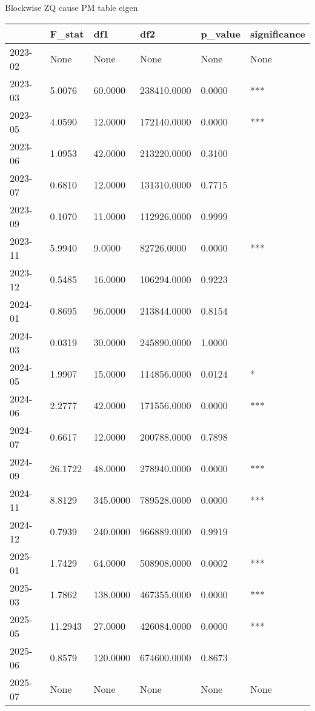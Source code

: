 Blockwise ZQ cause PM table eigen

\begin{center}
  \begin{tabular}{l|l|l|l|l|l}
    \hline
  & F\_stat & df1 & df2 & p\_value & significance\\
  \hline
    2023-02 & None & None & None & None & None\\
    \hline
    2023-03 & 5.0076 & 60.0000 & 238410.0000 & 0.0000 & ***\\
    \hline
    2023-05 & 4.0590 & 12.0000 & 172140.0000 & 0.0000 & ***\\
    \hline
    2023-06 & 1.0953 & 42.0000 & 213220.0000 & 0.3100 & \\
    \hline
    2023-07 & 0.6810 & 12.0000 & 131310.0000 & 0.7715 & \\
    \hline
    2023-09 & 0.1070 & 11.0000 & 112926.0000 & 0.9999 & \\
    \hline
    2023-11 & 5.9940 & 9.0000 & 82726.0000 & 0.0000 & ***\\
    \hline
    2023-12 & 0.5485 & 16.0000 & 106294.0000 & 0.9223 & \\
    \hline
    2024-01 & 0.8695 & 96.0000 & 213844.0000 & 0.8154 & \\
    \hline
    2024-03 & 0.0319 & 30.0000 & 245890.0000 & 1.0000 & \\
    \hline
    2024-05 & 1.9907 & 15.0000 & 114856.0000 & 0.0124 & *\\
    \hline
    2024-06 & 2.2777 & 42.0000 & 171556.0000 & 0.0000 & ***\\
    \hline
    2024-07 & 0.6617 & 12.0000 & 200788.0000 & 0.7898 & \\
    \hline
    2024-09 & 26.1722 & 48.0000 & 278940.0000 & 0.0000 & ***\\
    \hline
    2024-11 & 8.8129 & 345.0000 & 789528.0000 & 0.0000 & ***\\
    \hline
    2024-12 & 0.7939 & 240.0000 & 966889.0000 & 0.9919 & \\
    \hline
    2025-01 & 1.7429 & 64.0000 & 508908.0000 & 0.0002 & ***\\
    \hline
    2025-03 & 1.7862 & 138.0000 & 467355.0000 & 0.0000 & ***\\
    \hline
    2025-05 & 11.2943 & 27.0000 & 426084.0000 & 0.0000 & ***\\
    \hline
    2025-06 & 0.8579 & 120.0000 & 674600.0000 & 0.8673 & \\
    \hline
    2025-07 & None & None & None & None & None\\
    \hline
  \end{tabular}
\end{center}


